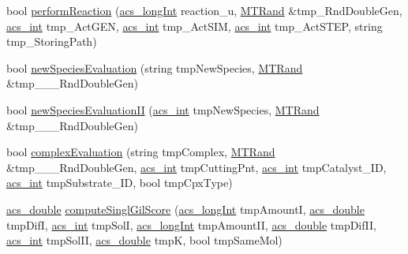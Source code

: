 \begin{DoxyCompactItemize}
bool \hyperlink{classenvironment_a1db4e67ba458a54f4fab3e10a203765c}{perform\-Reaction} (\hyperlink{acs__headers_8h_a19319d75f02db4308bc5c0026d98cd85}{acs\-\_\-long\-Int} reaction\-\_\-u, \hyperlink{class_m_t_rand}{M\-T\-Rand} \&tmp\-\_\-\-Rnd\-Double\-Gen, \hyperlink{acs__headers_8h_a8d277355641a098190360234e2ebde35}{acs\-\_\-int} tmp\-\_\-\-Act\-G\-E\-N, \hyperlink{acs__headers_8h_a8d277355641a098190360234e2ebde35}{acs\-\_\-int} tmp\-\_\-\-Act\-S\-I\-M, \hyperlink{acs__headers_8h_a8d277355641a098190360234e2ebde35}{acs\-\_\-int} tmp\-\_\-\-Act\-S\-T\-E\-P, string tmp\-\_\-\-Storing\-Path)
\item 
bool \hyperlink{classenvironment_aa4b3e51bd7bbb2a287f0963e261cb79b}{new\-Species\-Evaluation} (string tmp\-New\-Species, \hyperlink{class_m_t_rand}{M\-T\-Rand} \&tmp\-\_\-\-\_\-\-\_\-\-Rnd\-Double\-Gen)
\item 
bool \hyperlink{classenvironment_ac58fdd1a7e2880585ab9716d9db1e8e2}{new\-Species\-Evaluation\-I\-I} (\hyperlink{acs__headers_8h_a8d277355641a098190360234e2ebde35}{acs\-\_\-int} tmp\-New\-Species, \hyperlink{class_m_t_rand}{M\-T\-Rand} \&tmp\-\_\-\-\_\-\-\_\-\-Rnd\-Double\-Gen)
\item 
bool \hyperlink{classenvironment_a866ffc56a30e1b2698158a5428a1de0c}{complex\-Evaluation} (string tmp\-Complex, \hyperlink{class_m_t_rand}{M\-T\-Rand} \&tmp\-\_\-\-\_\-\-\_\-\-Rnd\-Double\-Gen, \hyperlink{acs__headers_8h_a8d277355641a098190360234e2ebde35}{acs\-\_\-int} tmp\-Cutting\-Pnt, \hyperlink{acs__headers_8h_a8d277355641a098190360234e2ebde35}{acs\-\_\-int} tmp\-Catalyst\-\_\-\-I\-D, \hyperlink{acs__headers_8h_a8d277355641a098190360234e2ebde35}{acs\-\_\-int} tmp\-Substrate\-\_\-\-I\-D, bool tmp\-Cpx\-Type)
\item 
\hyperlink{acs__headers_8h_ab776853a005fcbf56af0424a2a4dd607}{acs\-\_\-double} \hyperlink{classenvironment_ae1270b9c235dd6b28413075197dba8e0}{compute\-Singl\-Gil\-Score} (\hyperlink{acs__headers_8h_a19319d75f02db4308bc5c0026d98cd85}{acs\-\_\-long\-Int} tmp\-Amount\-I, \hyperlink{acs__headers_8h_ab776853a005fcbf56af0424a2a4dd607}{acs\-\_\-double} tmp\-Dif\-I, \hyperlink{acs__headers_8h_a8d277355641a098190360234e2ebde35}{acs\-\_\-int} tmp\-Sol\-I, \hyperlink{acs__headers_8h_a19319d75f02db4308bc5c0026d98cd85}{acs\-\_\-long\-Int} tmp\-Amount\-I\-I, \hyperlink{acs__headers_8h_ab776853a005fcbf56af0424a2a4dd607}{acs\-\_\-double} tmp\-Dif\-I\-I, \hyperlink{acs__headers_8h_a8d277355641a098190360234e2ebde35}{acs\-\_\-int} tmp\-Sol\-I\-I, \hyperlink{acs__headers_8h_ab776853a005fcbf56af0424a2a4dd607}{acs\-\_\-double} tmp\-K, bool tmp\-Same\-Mol)

\end{DoxyCompactItemize}
